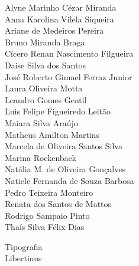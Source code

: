 {\begin{minipage}[t]{.5\textwidth}
\hspace{1.5em}Alyne Marinho Cézar Miranda\\
\hspace{1.5em}Anna Karolina Vilela Siqueira\\
\hspace{1.5em}Ariane de Medeiros Pereira\\
\hspace{1.5em}Bruno Miranda Braga\\
\hspace{1.5em}Cícero Renan Nascimento Filgueira\\
\hspace{1.5em}Daise Silva dos Santos\\
\hspace{1.5em}José Roberto Gimael Ferraz Junior\\
\hspace{1.5em}Laura Oliveira Motta\\
\hspace{1.5em}Leandro Gomes Gentil\\
\hspace{1.5em}Luis Felipe Figueiredo Leitão\\
\hspace{1.5em}Maiara Silva Araújo\\
\hspace{1.5em}Matheus Amilton Martins\\
\hspace{1.5em}Marcela de Oliveira Santos Silva\\
\hspace{1.5em}Marina Rockenback\\
\hspace{1.5em}Natália M. de Oliveira Gonçalves\\
\hspace{1.5em}Natiele Fernanda de Souza Barbosa\\
\hspace{1.5em}Pedro Teixeira Monteiro\\
\hspace{1.5em}Renata dos Santos de Mattos\\
\hspace{1.5em}Rodrigo Sampaio Pinto\\
\hspace{1.5em}Thaís Silva Félix Dias
\end{minipage}%

\vspace{5mm}

Tipografia\\
\hspace{1.5em}Libertinus

}
